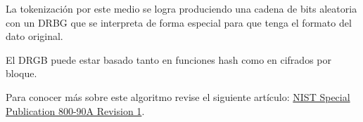%
%

La tokenización por este medio se logra produciendo una cadena
de bits aleatoria con un DRBG que se interpreta de forma
especial para que tenga el formato del dato original.

El DRGB puede estar basado tanto en funciones hash como en
cifrados por bloque.

Para conocer más sobre este algoritmo revise el siguiente
artículo:
\href{https://nvlpubs.nist.gov/nistpubs/SpecialPublications/NIST.SP.800-90Ar1.pdf}
{NIST Special Publication 800-90A Revision 1}.
